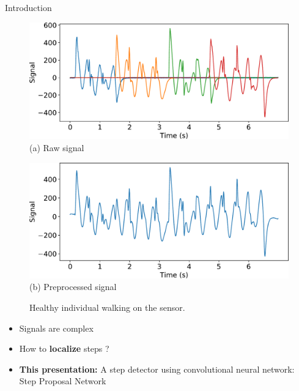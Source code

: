\documentclass[8pt,t,aspectratio=1610]{beamer}
\begin{document}
\begin{frame}{Introduction}{}
\pause
\begin{figure}[h]
    \begin{minipage}{\linewidth}
        \centering
        \begin{minipage}{0.49\linewidth}
            \centering
            \includegraphics[width=0.9\linewidth]{signal_walk_young_female_before_preproc_2.pdf}\\
            {\small (a)\; Raw signal}
        \end{minipage}
        \begin{minipage}{0.49\linewidth}
            \centering
            \includegraphics[width=0.9\linewidth]{signal_walk_young_female_after_preproc_2.pdf}\\
            {\small (b)\; Preprocessed signal}
        \end{minipage}
    \end{minipage}
    \caption{Healthy individual walking on the sensor.}
\end{figure}
\begin{itemize}
    \item Signals are complex
    \item How to \textbf{localize} steps ?
    \item \textbf{This presentation:} A step detector using convolutional neural network: Step Proposal Network
\end{itemize}

\end{frame}
%
\end{document}
